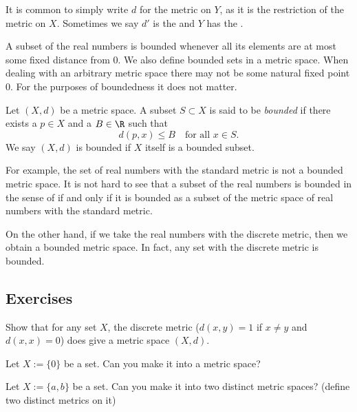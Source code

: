 \documentclass[12pt]{book}
\begin{document}
It is common to simply write $d$ for the metric on $Y$, as it is 
the restriction of the metric on $X$.
Sometimes we say $d'$ is
the \emph{} and $Y$ has the
\emph{}.

\medskip

A subset of the real
numbers is bounded whenever all its elements are at most some fixed distance
from 0.
We also define bounded sets in a metric space.
When dealing with an arbitrary metric space there may not be some
natural fixed point 0.
For the purposes of boundedness it does not matter.

\begin{defn}
Let $(X,d)$ be a metric space.
A subset $S \subset X$ is said to be
\emph{bounded} if there exists a $p \in X$ and a
$B \in \R$ such that
\begin{equation*}
d(p,x) \leq B \quad \text{for all $x \in S$}.
\end{equation*}
We say $(X,d)$ is bounded if $X$ itself is a bounded subset.
\end{defn}

For example, the set of real numbers with the standard metric is not a
bounded metric space.
It is not hard to see that a
subset of the real numbers is bounded in the
sense of  if and only if it is bounded as a subset of the
metric space of real numbers with the standard metric.

On the other hand, if we take the real numbers with the discrete metric,
then we obtain a bounded metric space.
In fact, any set with the
discrete metric is bounded.

\subsection*{Exercises}

\begin{exercise}
Show that for any set $X$, the discrete metric ($d(x,y) = 1$ if $x\not=y$ and
$d(x,x) = 0$) does give a metric space $(X,d)$.
\end{exercise}

\begin{exercise}
Let $X := \{ 0 \}$ be a set.
Can you make it into a metric space?
\end{exercise}

\begin{exercise}
Let $X := \{ a, b \}$ be a set.
Can you make it into two distinct metric
spaces?  (define two distinct metrics on it)
\end{exercise}
\end{document}
